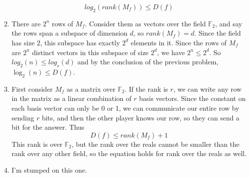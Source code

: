 \documentclass{article}
\newenvironment{problem}[2][Problem]{\begin{trivlist}
\item[\hskip \labelsep {\bfseries #1}\hskip \labelsep {\bfseries #2.}]}{\end{trivlist}}
\begin{document}
\begin{problem}{1}
\begin{enumerate}
      \begin{equation}
        log_2(rank(M_f)) \leq D(f)
      \end{equation}
    \item There are $2^n$ rows of $M_f$. Consider them as vectors over the field
      $\mathbb{F}_2$, and say the rows span a
      subspace of dimension $d$, so $rank(M_f) = d$. Since the field has size 2, this
      subspace has exactly $2^d$ elements in
      it. Since the rows of $M_f$ are $2^n$ distinct vectors in this
      subspace of size $2^d$, we have $2^n \leq 2^d$. So
      $log_2(n) \leq log_s(d)$ and by the conclusion of the previous
      problem, $\log_2(n) \leq D(f)$.
    \item First consider $M_f$ as a matrix over $\mathbb{F}_2$. If the
      rank is $r$, we can write any row in the matrix as a linear
      combination of $r$ basis vectors. Since the constant on each
      basis vector can only be 0 or 1, we can communicate our
      entire row by sending $r$ bits, and then the other player
      knows our row, so they can send a bit for the answer. Thus
      \begin{equation}
        D(f) \leq rank(M_f) + 1
      \end{equation}
      This rank is over $\mathbb{F}_2$, but the rank over the reals
      cannot be smaller than the rank over any other field, so the
      equation holds for rank over the reals as well.
    \item I'm stumped on this one.
  \end{enumerate}
\end{problem}
\end{document}
